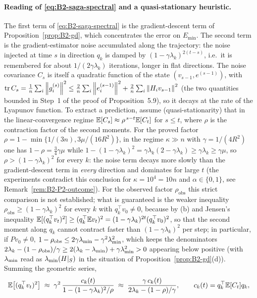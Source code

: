 \paragraph{Reading of \eqref{eq:B2-saga-spectral} and a quasi-stationary heuristic.}
The first term of \eqref{eq:B2-saga-spectral} is the gradient-descent term of Proposition~\ref{prop:B2-gd},
which concentrates the error on $E_{\min}$. The second term is the gradient-estimator noise accumulated along
the trajectory: the noise injected at time $s$ in direction $q_k$ is damped by $(1-\gamma\lambda_k)^{2(t-s)}$, i.e.\
it is remembered for about $1/(2\gamma\lambda_k)$ iterations, longer in flat directions. The noise covariance
$C_s$ is itself a quadratic function of the state $(v_{s-1},e^{(s-1)})$, with
$\operatorname{tr} C_s=\frac1n\sum_i\left\|g_i^{(s)}\right\|^2\le\frac2n\sum_i\left\|e_i^{(s-1)}\right\|^2+\frac2n\sum_i\left\|H_iv_{s-1}\right\|^2$ (the two
quantities bounded in Step~1 of the proof of Proposition~5.9), so it decays at the rate of the Lyapunov
function. To extract a prediction, assume (quasi-stationarity) that in the linear-convergence regime
$\mathbb{E}[C_s]\approx\rho^{\,s-t}\mathbb{E}[C_t]$ for $s\le t$, where $\rho$ is the contraction factor of the second moments.
For the proved factor $\rho=1-\min\{1/(3n),3\mu/(16R^2)\}$, in the regime $\kappa\gg n$ with
$\gamma=1/(4R^2)$ one has $1-\rho=\frac34\gamma\mu$ while $1-(1-\gamma\lambda_k)^2=\gamma\lambda_k(2-\gamma\lambda_k)\ge\gamma\lambda_k\ge\gamma\mu$,
so $\rho>(1-\gamma\lambda_k)^2$ for every $k$: the noise term decays more slowly than the gradient-descent term in
\emph{every} direction and dominates for large $t$ (the experiments contradict this conclusion for $\kappa=10^4=10n$ and
$\alpha\in\{0,1\}$, see Remark~\ref{rem:B2-P2-outcome}). For the observed factor $\rho_{\mathrm{obs}}$ this strict comparison
is not established; what is guaranteed is the weaker inequality $\rho_{\mathrm{obs}}\ge(1-\gamma\lambda_k)^2$ for every
$k$ with $q_k^\top v_0\neq0$, because by (b) and Jensen's inequality
$\mathbb{E}[(q_k^\top v_t)^2]\ge(q_k^\top\mathbb{E} v_t)^2=(1-\gamma\lambda_k)^{2t}(q_k^\top v_0)^2$, so that the second moment along $q_k$
cannot contract faster than $(1-\gamma\lambda_k)^2$ per step; in particular, if $Pv_0\neq0$,
$1-\rho_{\mathrm{obs}}\le2\gamma\lambda_{\min}-\gamma^2\lambda_{\min}^2$, which keeps the denominators
$2\lambda_k-(1-\rho_{\mathrm{obs}})/\gamma\ge2(\lambda_k-\lambda_{\min})+\gamma\lambda_{\min}^2>0$ appearing below positive (with $\lambda_{\min}$ read
as $\lambda_{\min}(H|_S)$ in the situation of Proposition~\ref{prop:B2-gd}(d)). Summing the geometric series,
\begin{equation}\label{eq:B2-saga-heuristic}
\mathbb{E}\big[(q_k^\top v_t)^2\big]\;\approx\;\gamma^2\,\frac{c_k(t)}{1-(1-\gamma\lambda_k)^2/\rho}
\;\approx\;\frac{\gamma\,c_k(t)}{2\lambda_k-(1-\rho)/\gamma},
\qquad c_k(t)=q_k^\top\mathbb{E}[C_t]q_k ,
\end{equation}
